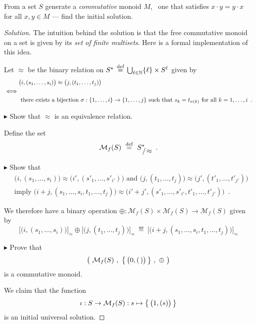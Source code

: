 \begin{exercise}
From a set $S$ generate a \textit{commutative} monoid $M$, \ie~one that
satisfies $x \cdot y = y \cdot x$ for all $x, y \in M$ --- find the initial
solution.
\end{exercise}
\begin{proof}[Solution]
The intuition behind the solution is that the free commutative monoid on a set
is given by its \emph{set of finite multisets}.  Here is a formal
implementation of this idea.

Let $\approx$ be the binary relation on
$S^\star \,\stackrel{\text{def}}{=}\, \bigcup_{\ell\in\mathbb{N}}\{ \ell \} \times S^\ell$ given by
\begin{align*}
  & \big(i,(s_1,\ldots,s_i)\big)
  \approx
  \big(j,(t_1,\ldots,t_j)\big)
  \\
  \iff & 
  \\
  & 
  \text{ there exists a bijection } 
  \sigma: \{ 1,\ldots,i \}\to\{ 1,\ldots,j \}
  \text{ such that } s_k = t_{\sigma(k)} \text{ for all } k = 1,\ldots,i
  \enspace.
\end{align*}

$\blacktriangleright$ Show that $\approx$ is an equivalence relation.

Define the set
\[
  \mathcal M_f(S) \ \eqdef \ S^\star_{\,\raisebox{0mm}{$/\!\approx$}}
  \enspace.
\]

$\blacktriangleright$ Show that 
\begin{align*}
  &\big(i,(s_1,\ldots,s_i)\big)
  \approx 
  \big(i',(s'_1,\ldots,s'_{i'})\big)
  \text{ and }
  \big(j,(t_1,\ldots,t_j)\big)
  \approx 
  \big(j',(t'_1,\ldots,t'_{j'})\big)
  \\
  &\text{imply }
  \big(i+j,(s_1,\ldots,s_i,t_1,\ldots,t_j)\big)
  \approx 
  \big(i'+j',(s'_1,\ldots,s'_{i'},t'_1,\ldots,t'_{j'})\big)
  \enspace.
\end{align*}

We therefore have a binary operation 
$\oplus: \mathcal M_f(S) \times \mathcal M_f(S) \to \mathcal M_f(S)$ given by
\[
  \big[\big(i,(s_1,\ldots,s_i)\big)\big]_\approx 
  \oplus 
  \big[\big(j,(t_1,\ldots,t_j)\big)\big]_\approx 
  \ \eqdef \ 
  \big[\big(i+j,(s_1,\ldots,s_i,t_1,\ldots,t_j)\big)\big]_\approx 
\]

$\blacktriangleright$ Prove that
\[
  \big(\ 
    \mathcal M_f(S) 
    \ , \ 
    \bigsetof{\,\big( 0 , (\,)\big)\,}
    \ , \ 
    \oplus
    \ \big)
\]
is a commutative monoid. 

We claim that the function
\[
  \iota: S \to \mathcal M_f(S) : s \mapsto \big\{ \,\big(1,(s)\big)\, \big\}
\]
is an initial universal solution.  


\end{proof}
